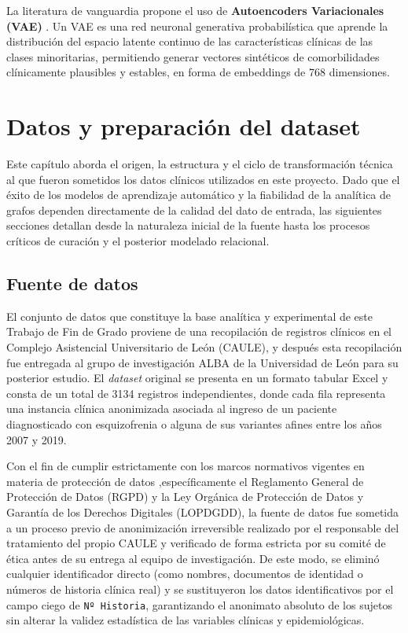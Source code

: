 \documentclass[12pt,a4paper,onecolumn,oneside]{report}
\begin{document}
La literatura de vanguardia propone el uso de \textbf{Autoencoders Variacionales (VAE)} \cite{saboori2025predictive}. Un VAE es una red neuronal generativa probabilística que aprende la distribución del espacio latente continuo de las características clínicas de las clases minoritarias, permitiendo generar vectores sintéticos de comorbilidades clínicamente plausibles y estables, en forma de embeddings de 768 dimensiones.


\chapter{Datos y preparación del dataset}
Este capítulo aborda el origen, la estructura y el ciclo de transformación técnica al que fueron sometidos los datos clínicos utilizados en este proyecto. Dado que el éxito de los modelos de aprendizaje automático y la fiabilidad de la analítica de grafos dependen directamente de la calidad del dato de entrada, las siguientes secciones detallan desde la naturaleza inicial de la fuente hasta los procesos críticos de curación y el posterior modelado relacional.


\section{Fuente de datos}

El conjunto de datos que constituye la base analítica y experimental de este Trabajo de Fin de Grado proviene de una recopilación de registros clínicos en el Complejo Asistencial Universitario de León (CAULE), y después esta recopilación fue entregada al grupo de investigación ALBA de la Universidad de León para su posterior estudio. El \textit{dataset} original se presenta en un formato tabular Excel y consta de un total de 3134 registros independientes, donde cada fila representa una instancia clínica anonimizada asociada al ingreso de un paciente diagnosticado con esquizofrenia o alguna de sus variantes afines entre los años 2007 y 2019.

Con el fin de cumplir estrictamente con los marcos normativos vigentes en materia de protección de datos ,específicamente el Reglamento General de Protección de Datos (RGPD) y la Ley Orgánica de Protección de Datos y Garantía de los Derechos Digitales (LOPDGDD), la fuente de datos fue sometida a un proceso previo de anonimización irreversible realizado por el responsable del tratamiento del propio CAULE y verificado de forma estricta por su comité de ética antes de su entrega al equipo de investigación. De este modo, se eliminó cualquier identificador directo (como nombres, documentos de identidad o números de historia clínica real) y se sustituyeron los datos identificativos por el campo ciego de \texttt{Nº Historia}, garantizando el anonimato absoluto de los sujetos sin alterar la validez estadística de las variables clínicas y epidemiológicas.
\end{document}
